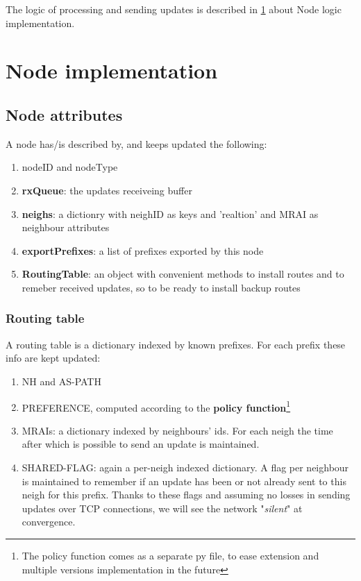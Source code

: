 \documentclass[fleqn,10pt]{SelfArx} %
\begin{document}
The logic of processing and sending updates is described in \cref{sec:nodeLogic} about Node logic implementation.

\section{Node implementation}\label{sec:nodeLogic}

\subsection*{Node attributes}
A node has/is described by, and keeps updated the following:
\begin{enumerate}[noitemsep]
  \item nodeID and nodeType
  \item \textbf{rxQueue}: the updates receiveing buffer
  \item \textbf{neighs}: a dictionry with neighID as keys and 'realtion' and MRAI as neighbour attributes
  \item \textbf{exportPrefixes}: a list of prefixes exported by this node
  \item \textbf{RoutingTable}: an object with convenient methods to install routes and to remeber received updates, so to be ready to install backup routes
\end{enumerate}

\subsubsection*{Routing table}
A routing table is a dictionary indexed by known prefixes. For each prefix these info are kept updated:
\begin{enumerate}[noitemsep]
  \item NH and AS-PATH
  \item PREFERENCE, computed according to the \textbf{policy function}\footnote{The policy function comes as a separate py file, to ease extension and multiple versions implementation in the future}
  \item MRAIs: a dictionary indexed by neighbours' ids. For each neigh the time after which is possible to send an update is maintained.
  \item SHARED-FLAG: again a per-neigh indexed dictionary. A flag per neighbour is maintained to remember if an update has been or not already sent to this neigh for this prefix. Thanks to these flags and assuming no losses in sending updates over TCP connections, we will see the network "\textit{silent}" at convergence.
\end{enumerate}
\end{document}
